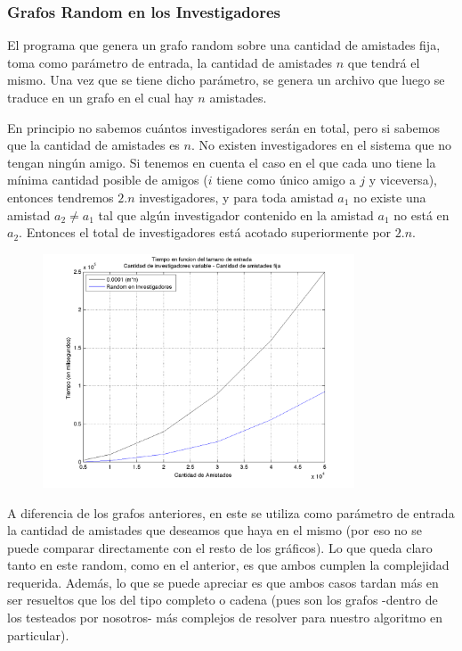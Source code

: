 \subsubsection{Grafos Random en los Investigadores}
El programa que genera un grafo random sobre una cantidad de amistades fija, toma como parámetro de entrada, la cantidad de amistades $n$ que tendrá el mismo. Una vez que se tiene dicho parámetro, se genera un archivo que luego se traduce en un grafo en el cual hay $n$ amistades. 

En principio no sabemos cuántos investigadores serán en total, pero si sabemos que la cantidad de amistades es $n$. No existen investigadores en el sistema que no tengan ningún amigo. Si tenemos en cuenta el caso en el que cada uno tiene la mínima cantidad posible de amigos ($i$ tiene como único amigo a $j$ y viceversa), entonces tendremos $2.n$ investigadores, y para toda amistad $a_1$ no existe una amistad $a_2 \neq a_1$ tal que algún investigador contenido en la amistad $a_1$ no está en $a_2$. Entonces el total de investigadores está acotado superiormente por $2.n$.


\begin{figure}[h]
	\centering
	\includegraphics[width=350px]{./figs/cotaAmistades.png}
\end{figure}

A diferencia de los grafos anteriores, en este se utiliza como parámetro de entrada la cantidad de amistades que deseamos que haya en el mismo (por eso no se puede comparar directamente con el resto de los gráficos). Lo que queda claro tanto en este random, como en el anterior, es que ambos cumplen la complejidad requerida. Además, lo que se puede apreciar es que ambos casos tardan más en ser resueltos que los del tipo completo o cadena (pues son los grafos -dentro de los testeados por nosotros- más complejos de resolver para nuestro algoritmo en particular).

